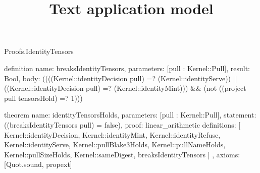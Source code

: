 \begin{lexlean}{Proofs.IdentityTensors}
\title{Text application model}
\begin{semanticmodule}
definition{
  name: breaksIdentityTensors,
  parameters: [pull : Kernel::Pull],
  result: Bool,
  body: ((((Kernel::identityDecision pull) =? (Kernel::identityServe)) || ((Kernel::identityDecision pull) =? (Kernel::identityMint))) && (not ((project pull tensorsHold) =? 1)))
}

theorem{
  name: identityTensorsHolds,
  parameters: [pull : Kernel::Pull],
  statement: ((breaksIdentityTensors pull) = false),
  proof: linear_arithmetic{
    definitions: [
      Kernel::identityDecision,
      Kernel::identityMint,
      Kernel::identityRefuse,
      Kernel::identityServe,
      Kernel::pullBlake3Holds,
      Kernel::pullNameHolds,
      Kernel::pullSizeHolds,
      Kernel::sameDigest,
      breaksIdentityTensors
    ]
  },
  axioms: [Quot.sound, propext]
}
\end{semanticmodule}
\end{lexlean}

